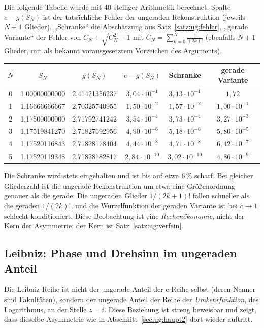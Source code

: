 \begin{beobachtung}\label{beob:ug:tab}
Die folgende Tabelle wurde mit 40-stelliger Arithmetik berechnet. Spalte $e-g(S_N)$ ist der tatsächliche Fehler der ungeraden Rekonstruktion (jeweils $N+1$ Glieder), „Schranke“ die Abschätzung aus Satz~\ref{satz:ug:fehler}, „gerade Variante“ der Fehler von $C_N+\sqrt{C_N^2-1}$ mit $C_N=\sum_{k=0}^N\frac1{(2k)!}$ (ebenfalls $N+1$ Glieder, mit als bekannt vorausgesetztem Vorzeichen des Arguments).
\begin{center}
\small
\begin{tabular}{c c c c c c}
$N$ & $S_N$ & $g(S_N)$ & $e-g(S_N)$ & Schranke & gerade Variante\\\hline
0 & 1{,}00000000000 & 2{,}41421356237 & $3{,}04\cdot10^{-1}$ & $3{,}13\cdot10^{-1}$ & $1{,}72$\\
1 & 1{,}16666666667 & 2{,}70325740955 & $1{,}50\cdot10^{-2}$ & $1{,}57\cdot10^{-2}$ & $1{,}00\cdot10^{-1}$\\
2 & 1{,}17500000000 & 2{,}71792741242 & $3{,}54\cdot10^{-4}$ & $3{,}73\cdot10^{-4}$ & $3{,}27\cdot10^{-3}$\\
3 & 1{,}17519841270 & 2{,}71827692956 & $4{,}90\cdot10^{-6}$ & $5{,}18\cdot10^{-6}$ & $5{,}80\cdot10^{-5}$\\
4 & 1{,}17520116843 & 2{,}71828178404 & $4{,}44\cdot10^{-8}$ & $4{,}71\cdot10^{-8}$ & $6{,}42\cdot10^{-7}$\\
5 & 1{,}17520119348 & 2{,}71828182817 & $2{,}84\cdot10^{-10}$ & $3{,}02\cdot10^{-10}$ & $4{,}86\cdot10^{-9}$\\
\end{tabular}
\end{center}
Die Schranke wird stets eingehalten und ist bis auf etwa $6\,\%$ scharf. Bei gleicher Gliederzahl ist die ungerade Rekonstruktion um etwa eine Größenordnung genauer als die gerade: Die ungeraden Glieder $1/(2k+1)!$ fallen schneller als die geraden $1/(2k)!$, und die Wurzelfunktion der geraden Variante ist bei $c\to1$ schlecht konditioniert. Diese Beobachtung ist eine \emph{Rechenökonomie}, nicht der Kern der Asymmetrie; der Kern ist Satz~\ref{satz:ug:verfein}.
\end{beobachtung}

\subsection{Leibniz: Phase und Drehsinn im ungeraden Anteil}
\label{sec:ug:leibniz}

Die Leibniz-Reihe ist nicht der ungerade Anteil der e-Reihe selbst (deren Nenner sind Fakultäten), sondern der ungerade Anteil der Reihe der \emph{Umkehrfunktion}, des Logarithmus, an der Stelle $z=i$. Diese Beziehung ist streng beweisbar und zeigt, dass dieselbe Asymmetrie wie in Abschnitt~\ref{sec:ug:haupt2} dort wieder auftritt.

